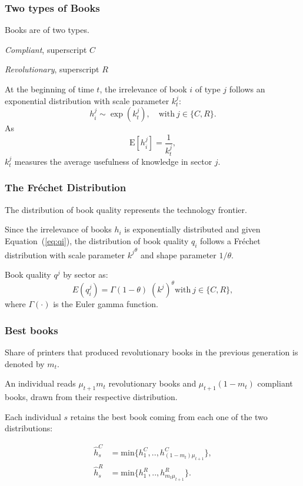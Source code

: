 \documentclass[usepdftitle=false,aspectratio=169,xcolor=dvipsnames]{beamer}
\begin{document}
	\begin{frame}
\frametitle{Two types of Books}

Books are of two types.


 \textit{Compliant},  superscript ${C}$

  \textit{Revolutionary},  superscript $R$

At the beginning of time $t$, the irrelevance of book $i$ of type $j$ follows an exponential distribution with scale parameter $k_t^j$:
\begin{equation}
h^j_i \sim \exp(k_{t}^j), \quad \text{with} \ j\in \{C,R\}.
\end{equation}
 As
$$
\mbox{E}[h^j_i]=\frac{1}{k^j_{t}},
$$
$k^j_{t}$ measures the average usefulness of knowledge in sector $j$.

\end{frame}

	\begin{frame}
\frametitle{The Fr\'echet Distribution}

The distribution of book quality represents the technology frontier.

Since the irrelevance of books $h_i$ is exponentially distributed and given Equation~(\ref{eq:qi}), the distribution of book quality $q_i$ follows a Fr\'echet distribution with scale parameter ${k^j}^\theta$ and shape parameter $1/\theta$.

Book quality $q^j$ by sector as:
\begin{equation}
E(q^j_i)=\Gamma(1-\theta) \; (k^j)^{\theta} \text{with} \ j\in \{C,R\},
\end{equation}
where $\Gamma(\cdot)$ is the Euler gamma function.
\end{frame}

	\begin{frame}
\frametitle{Best books}

 Share of printers that produced revolutionary books in the previous generation is denoted by  $m_{t}$.

An individual  reads $ \mu_{t+1} m_{t} $ revolutionary books  and $ \mu_{t+1}
 (1-m_{t}) $ compliant books, drawn from their respective distribution.

 Each individual $s$ retains the best book coming from each one of the two distributions:

\begin{align*}	
   \hat{h}^C_s&=\text{min}\{h^C_1,..,h^C_{(1-m_{t}) \mu_{t+1}}\},
 \\ \hat{h}^R_s&=\text{min}\{h^R_1,..,h^R_{ m_{t} \mu_{t+1} }\}.
 \end{align*}

\end{frame}
\end{document}

